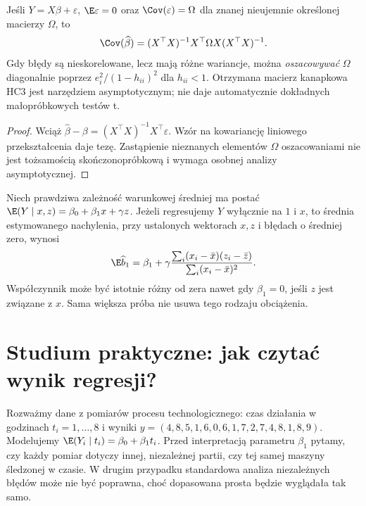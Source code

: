 \begin{stwierdzenie}
\label{prop:hetero-ols}
Jeśli $Y=X\beta+\varepsilon$, $\E\varepsilon=0$ oraz
$\Cov(\varepsilon)=\Omega$ dla znanej nieujemnie
określonej macierzy $\Omega$, to
\[
 \Cov(\widehat\beta)=(X^\top X)^{-1}X^\top
 \Omega X(X^\top X)^{-1}.
\]
Gdy błędy są nieskorelowane, lecz mają różne wariancje,
można \emph{oszacowywać} $\Omega$ diagonalnie poprzez
$e_i^2/(1-h_{ii})^2$ dla $h_{ii}<1$. Otrzymana
macierz kanapkowa HC3 jest narzędziem asymptotycznym;
nie daje automatycznie dokładnych małopróbkowych testów t.
\end{stwierdzenie}
\begin{proof}
Wciąż $\widehat\beta-\beta
=(X^\top X)^{-1}X^\top\varepsilon$.
Wzór na kowariancję liniowego przekształcenia daje tezę.
Zastąpienie nieznanych elementów $\Omega$ oszacowaniami
nie jest tożsamością skończonopróbkową i wymaga osobnej
analizy asymptotycznej.
\end{proof}

\begin{przyklad}
Niech prawdziwa zależność warunkowej średniej ma postać
$\E(Y\mid x,z)=\beta_0+\beta_1x+\gamma z$.
Jeżeli regresujemy $Y$ wyłącznie na $1$ i $x$,
to średnia estymowanego nachylenia, przy ustalonych
wektorach $x,z$ i błędach o średniej zero, wynosi
\[
 \E\widehat b_1=\beta_1+
 \gamma\frac{\sum_i(x_i-\bar x)(z_i-\bar z)}
                   {\sum_i(x_i-\bar x)^2}.
\]
Współczynnik może być istotnie różny od zera nawet
gdy $\beta_1=0$, jeśli $z$ jest związane z $x$.
Sama większa próba nie usuwa tego rodzaju obciążenia.
\end{przyklad}

\section{Studium praktyczne: jak czytać wynik regresji?}
Rozważmy dane z pomiarów procesu technologicznego:
czas działania w godzinach $t_i=1,\ldots,8$ i wyniki
$y=(4{,}8,5{,}1,6{,}0,6{,}1,7{,}2,7{,}4,8{,}1,8{,}9)$.
Modelujemy $\E(Y_i\mid t_i)=\beta_0+\beta_1t_i$.
Przed interpretacją parametru $\beta_1$ pytamy, czy
każdy pomiar dotyczy innej, niezależnej partii, czy tej
samej maszyny śledzonej w czasie. W drugim przypadku
standardowa analiza niezależnych błędów może nie być
poprawna, choć dopasowana prosta będzie wyglądała tak samo.

